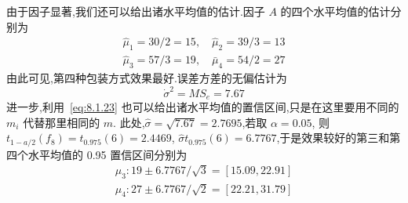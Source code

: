 \begin{example}
  由于因子显著,我们还可以给出诸水平均值的估计.因子 $A$ 的四个水平均值的估计分别为
  \begin{gather*}
    \hat{\mu}_{1}=30 / 2=15, \quad \hat{\mu}_{2}=39 / 3=13 \\
    \hat{\mu}_{3}=57 / 3=19, \quad \bar{\mu}_{4}=54 / 2=27
  \end{gather*}
  由此可见,第四种包装方式效果最好.误差方差的无偏估计为
  \begin{equation*}
    \dot{\sigma}^{2}=M S_{e}=7.67
  \end{equation*}
  进一步,利用~\eqref{eq:8.1.23} 也可以给出诸水平均值的置信区间,只是在这里要用不同的 $m_i$ 代替那里相同的 $m$. 此处,$\hat{\sigma} = \sqrt{7.67}=2.7695$,若取 $\alpha=0.05$, 则 $t_{1-a / 2}\left(f_{8}\right)=t_{0.975}(6)=2.4469$, $\hat{\sigma} t_{0.975}(6)=6.7767$,于是效果较好的第三和第四个水平均值的 0.95 置信区间分别为
\begin{gather*}
  \mu_{3} : 19 \pm 6.7767 / \sqrt{3}=[15.09,22.91] \\
  \mu_{4} : 27 \pm 6.7767 / \sqrt{2}=[22.21,31.79]
\end{gather*}
\end{example}

